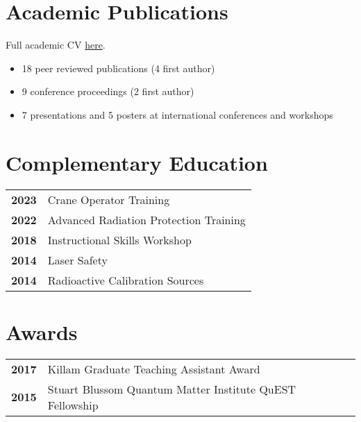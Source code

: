 \documentclass[lighthipster]{simplehipstercv}
\begin{document}
\begin{paracol}{2}
\vspace{0.5em}

\begin{minipage}[t]{0.37\textwidth}

\section*{Academic Publications}
Full academic CV \href{https://github.com/dfujim/cv/blob/master/academic_cv/fujimoto_cv.pdf}{here}.

\begin{itemize}[noitemsep]
    \item 18 peer reviewed publications (4 first author)
    \item 9 conference proceedings (2 first author)
    \item 7 presentations and 5 posters at international conferences and workshops
\end{itemize}

\bigskip
\vspace{-2em}

\section*{Complementary Education}
\begin{tabular}{>{\footnotesize\bfseries}r >{\footnotesize}p{}}
    2023 & Crane Operator Training \\
    2022 & Advanced Radiation Protection Training\\
    2018 & Instructional Skills Workshop\\
    2014 & Laser Safety\\
    2014 & Radioactive Calibration Sources
\end{tabular}

\bigskip

\end{minipage}\hfill
\begin{minipage}[t]{0.31\textwidth}

    \section*{Awards}
    \begin{tabular}{>{\footnotesize\bfseries}r >{\footnotesize}p{}}
        2017 & Killam Graduate Teaching Assistant Award\\
        2015 & Stuart Blussom Quantum Matter Institute QuEST Fellowship
    \end{tabular}


\end{minipage}
\end{paracol}
\end{document}
